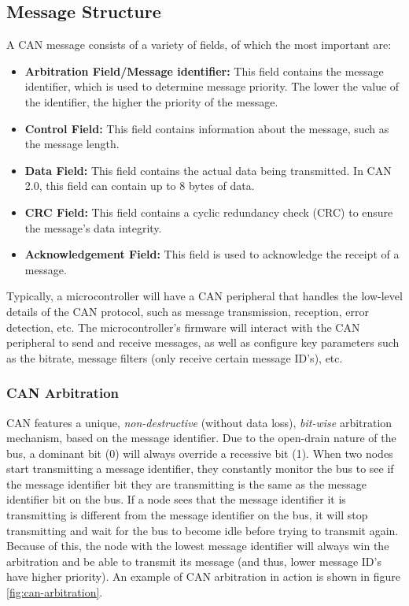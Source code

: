 \documentclass[main.tex]{subfiles}
\begin{document}
\subsection{Message Structure}
A CAN message consists of a variety of fields, of which the most important are:
\begin{itemize}
    \item \textbf{Arbitration Field/Message identifier:} This field contains the message identifier, which is used to determine message priority. The lower the value of the identifier, the higher the priority of the message.
    \item \textbf{Control Field:} This field contains information about the message, such as the message length.
    \item \textbf{Data Field:} This field contains the actual data being transmitted. In CAN 2.0, this field can contain up to 8 bytes of data.
    \item \textbf{CRC Field:} This field contains a cyclic redundancy check (CRC) to ensure the message's data integrity.
    \item \textbf{Acknowledgement Field:} This field is used to acknowledge the receipt of a message.
\end{itemize}

\noindent Typically, a microcontroller will have a CAN peripheral that handles the low-level details of the CAN protocol, such as message transmission, reception, error detection, etc. The microcontroller's firmware will interact with the CAN peripheral to send and receive messages, as well as configure key parameters such as the bitrate, message filters (only receive certain message ID's), etc.

\subsubsection{CAN Arbitration}
CAN features a unique, \textit{non-destructive} (without data loss), \textit{bit-wise} arbitration mechanism, based on the message identifier. Due to the open-drain nature of the bus, a dominant bit (0) will always override a recessive bit (1). When two nodes start transmitting a message identifier, they constantly monitor the bus to see if the message identifier bit they are transmitting is the same as the message identifier bit on the bus. If a node sees that the message identifier it is transmitting is different from the message identifier on the bus, it will stop transmitting and wait for the bus to become idle before trying to transmit again. Because of this, the node with the lowest message identifier will always win the arbitration and be able to transmit its message (and thus, lower message ID's have higher priority). An example of CAN arbitration in action is shown in figure \ref{fig:can-arbitration}.
\end{document}
